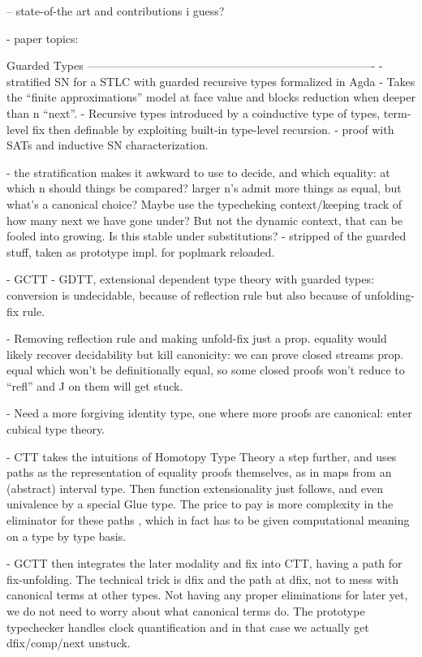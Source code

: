 \documentclass{article}
\begin{document}
-- state-of-the art and contributions i guess?

- paper topics:

  Guarded Types
  ----------------------------------------------------------------------------
  - stratified SN for a STLC with guarded recursive types formalized in Agda
    - Takes the ``finite approximations'' model at face value and blocks reduction when deeper than n ``next''.
    - Recursive types introduced by a coinductive type of types, term-level fix then definable by exploiting built-in type-level recursion.
    - proof with SATs and inductive SN characterization.
    
    - the stratification makes it awkward to use to decide, and which
    equality: at which n should things be compared? larger n's admit
    more things as equal, but what's a canonical choice?
    Maybe use the typecheking context/keeping track of how many next
    we have gone under? But not the dynamic context, that can be
    fooled into growing. Is this stable under substitutions?    
    - stripped of the guarded stuff, taken as prototype impl. for poplmark reloaded.
    
  - GCTT
    - GDTT, extensional dependent type theory with guarded types:
    conversion is undecidable, because of reflection rule but also
    because of unfolding-fix rule.
    
    - Removing reflection rule and making unfold-fix just a
    prop. equality would likely recover decidability but kill
    canonicity: we can prove closed streams prop. equal which won't be
    definitionally equal, so some closed proofs won't reduce to
    ``refl'' and J on them will get stuck.

    - Need a more forgiving identity type, one where more proofs are
    canonical: enter cubical type theory.
    
     - CTT takes the intuitions of Homotopy Type Theory a step
     further, and uses paths as the representation of equality proofs themselves,
     as in maps from an (abstract) interval type.
     Then function extensionality just follows, and even univalence by a special Glue type.
     The price to pay is more complexity in the eliminator for these paths
     , which in fact has to be given computational meaning on a type by type basis.

   - GCTT then integrates the later modality and fix into CTT, having a path for fix-unfolding.
     The technical trick is dfix and the path at dfix, not to mess with canonical terms at other types.
     Not having any proper eliminations for later yet, we do not need to worry about what canonical terms do.
     The prototype typechecker handles clock quantification and in that case we actually get dfix/comp/next unstuck.
     
\end{document}
